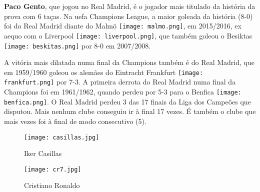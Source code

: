 \documentclass{report}
\begin{document}
\textbf{Paco Gento}, que jogou no Real Madrid, é o jogador mais titulado da história da prova com 6 taças. Na \acs{uefa} Champions League, a maior goleada da história (8-0) foi do Real Madrid diante do Malmö \texttt{[image: malmo.png]}, em 2015/2016, ex aequo com o Liverpool \texttt{[image: liverpool.png]}, que também goleou o Besiktas \texttt{[image: beskitas.png]} por 8-0 em 2007/2008. 

A vitória mais dilatada numa final da Champions também é do Real Madrid, que em 1959/1960 goleou os alemães do Eintracht Frankfurt \texttt{[image: frankfurt.png]} por 7-3. A primeira derrota do Real Madrid numa final da Champions foi em 1961/1962, quando perdeu por 5-3 para o Benfica \texttt{[image: benfica.png]}. O Real Madrid perdeu 3 das 17 finais da Liga dos Campeões que disputou. Mais nenhum clube conseguiu ir à final 17 vezes. É também o clube que mais vezes foi à final de modo consecutivo (5).

\begin{figure}[h]
    \centering
    \begin{minipage}{.4\textwidth}
        \centering
        \texttt{[image: casillas.jpg]}
        \caption{Iker Casillas}
        \label{fig:casillas}
    \end{minipage}
    \hfill
    \begin{minipage}{.4\textwidth}
        \centering
        \texttt{[image: cr7.jpg]}
        \caption{Cristiano Ronaldo}
        \label{fig:cr7}
    \end{minipage}
\end{figure}



\end{document}
